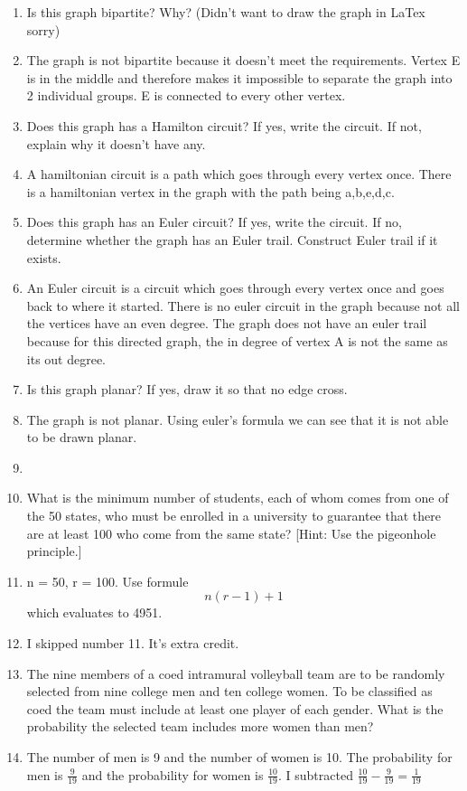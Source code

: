 \documentclass[letterpaper,11pt]{article}
\begin{document}
\begin{enumerate}
    \item Is this graph bipartite? Why? (Didn't want to draw the graph in LaTex sorry)
    \item[] The graph is not bipartite because it doesn't meet the requirements. Vertex E is in the middle and therefore makes it impossible to separate the graph into 2 individual groups. E is connected to every other vertex.
    \item Does this graph has a Hamilton circuit? If yes, write the circuit. If not, explain why it doesn't have any.
    \item[] A hamiltonian circuit is a path which goes through every vertex once. There is a hamiltonian vertex in the graph with the path being a,b,e,d,c.
    \item Does this graph has an Euler circuit? If yes, write the circuit. If no, determine whether the graph has an
    Euler trail. Construct Euler trail if it exists.
    \item[] An Euler circuit is a circuit which goes through every vertex once and goes back to where it started. There is no euler circuit in the graph because not all the vertices have an even degree. The graph does not have an euler trail because for this directed graph, the in degree of vertex A is not the same as its out degree.
    \item Is this graph planar? If yes, draw it so that no edge cross.
    \item [] The graph is not planar. Using euler's formula we can see that it is not able to be drawn planar.
    \item [] 
    \item What is the minimum number of students, each of whom comes from one of the 50 states, who must be
    enrolled in a university to guarantee that there are at least 100 who come from the same state? [Hint: Use the
    pigeonhole principle.]
    \item[] n = 50, r = 100. Use formule $$n(r-1)+1$$ which evaluates to 4951.
    \item I skipped number 11. It's extra credit.
    \item The nine members of a coed intramural volleyball team are to be randomly selected from nine college
    men and ten college women. To be classified as coed the team must include at least one player of each gender.
    What is the probability the selected team includes more women than men?
    \item[] The number of men is 9 and the number of women is 10. The probability for men is $\frac{9}{19}$ and the probability for women is $\frac{10}{19}$. I subtracted $\frac{10}{19} - \frac{9}{19} = \frac{1}{19}$

\end{enumerate}
\end{document}
